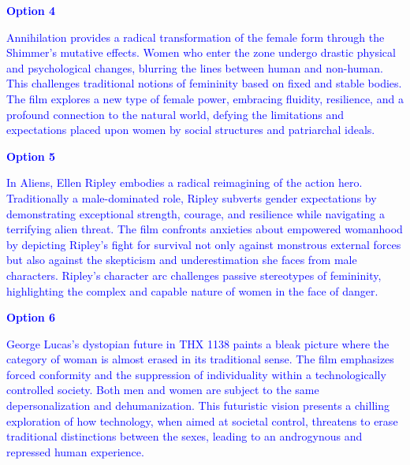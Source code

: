 \documentclass[11pt,fleqn]{book}
\begin{document}
\begin{exercise}
    \textcolor{blue}{
\textbf{Option 4}
}
    
    \textcolor{blue}{
    Annihilation provides a radical transformation of the female form through the Shimmer's  mutative effects. Women who enter the zone undergo drastic physical and psychological changes, blurring the lines between human and non-human. This challenges traditional notions of femininity based on fixed and stable bodies. The film explores a new type of female power, embracing fluidity, resilience, and a profound connection to the natural world, defying the limitations and expectations placed upon women by social structures and patriarchal ideals.}

    \textcolor{blue}{
\textbf{Option 5}
}
    
    \textcolor{blue}{
    In Aliens, Ellen Ripley embodies a radical reimagining of the action hero. Traditionally a male-dominated role, Ripley subverts gender expectations by demonstrating exceptional strength, courage, and resilience while navigating a terrifying alien threat. The film confronts anxieties about empowered womanhood by depicting Ripley's fight for survival not only against monstrous external forces but also against the skepticism and underestimation she faces from male characters. Ripley's character arc challenges passive stereotypes of femininity, highlighting the complex and capable nature of women in the face of danger.}

    \textcolor{blue}{
\textbf{Option 6}
}
    
    \textcolor{blue}{
    George Lucas's dystopian future in THX 1138 paints a bleak picture where the category of woman is almost erased in its traditional sense.  The film emphasizes forced conformity and the suppression of individuality within a technologically controlled society. Both men and women are subject to the same depersonalization and dehumanization. This  futuristic vision presents a chilling exploration of how technology, when aimed at societal control, threatens to erase traditional distinctions between the sexes, leading to an androgynous and repressed human experience.}
\end{exercise}
\end{document}
